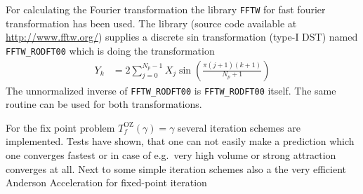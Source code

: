 For calculating the Fourier transformation the library \texttt{FFTW} for fast fourier transformation
\cite{FFTW05,FFTW97} has been used. The library (source code available at \url{http://www.fftw.org/}) supplies a discrete sin transformation (type-I DST)
named \verb"FFTW_RODFT00" which is doing the transformation
\begin{align}
Y_k &= 2 \sum_{j=0}^{N_p-1} X_j \sin\left(\frac{\pi(j + 1)(k + 1)}{N_p + 1}\right)
\end{align}
The unnormalized inverse of \verb"FFTW_RODFT00" is \verb"FFTW_RODFT00" itself.
The same routine can be used for both transformations.

For the fix point problem $T^\mathrm{OZ}_f(\gamma)=\gamma$ several iteration schemes are implemented. Tests have shown, that one can not easily make a prediction which one converges fastest or in case of e.g.\ very high volume or strong attraction converges at all. Next to some simple iteration schemes also a the very efficient Anderson Acceleration for fixed-point iteration \cite{Anderson1965,Walker2011,Toth2015}

